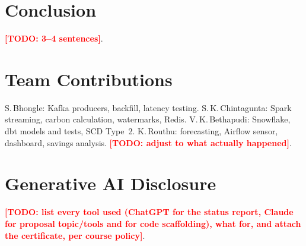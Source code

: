 \documentclass[conference]{IEEEtran}
\newcommand{\TODO}[1]{\textcolor{red}{\textbf{[TODO: #1]}}}   %
\begin{document}
\section{Conclusion}
\TODO{3--4 sentences}.

\section*{Team Contributions}
S.\,Bhongle: Kafka producers, backfill, latency testing. S.\,K.\,Chintagunta: Spark streaming, carbon calculation, watermarks, Redis. V.\,K.\,Bethapudi: Snowflake, dbt models and tests, SCD Type~2. K.\,Routhu: forecasting, Airflow sensor, dashboard, savings analysis. \TODO{adjust to what actually happened}.

\section*{Generative AI Disclosure}
\TODO{list every tool used (ChatGPT for the status report, Claude for proposal topic/tools and for code scaffolding), what for, and attach the certificate, per course policy}.
\end{document}
